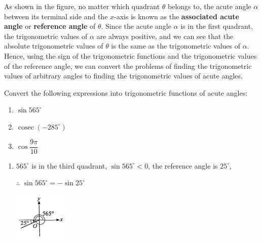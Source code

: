 \documentclass{report}
\begin{document}
As shown in the figure, no matter which quadrant $\theta$ belongs to, the acute angle $\alpha$ between its terminal side and the $x$-axis is known as the \textbf{associated acute angle} or \textbf{reference angle} of $\theta$. Since the acute angle $\alpha$ is in the first quadrant, the trigonometric values of $\alpha$ are always positive, and we can see that the absolute trigonometric values of $\theta$ is the same as the trigonometric values of $\alpha$. Hence, using the sign of the trigonometric functions and the trigonometric values of the reference angle, we can convert the problems of finding the trigonometric values of arbitrary angles to finding the trigonometric values of acute angles.

\begin{question}
    Convert the following expressions into trigonometric functions of acute angles:
    \vspace{-1em}
    \begin{multicols}{3}
        \begin{enumerate}[label=(\alph*)]
            \item $\sin 565^\circ$
            \item $\operatorname{cosec}\left(-285^\circ\right)$
            \item $\cos\dfrac{9\pi}{10}$
        \end{enumerate}
    \end{multicols}

    \sol{}
    \begin{enumerate}[label=(\alph*)]
        \item \begin{multicols}{2}
            $565^\circ$ is in the third quadrant, $\sin 565^\circ < 0$, the reference angle is $25^\circ$,

            $\therefore$ $\sin 565^\circ = -\sin 25^\circ$

            \vfill\null

            \begin{center}
                \includegraphics[width=0.2\textwidth]{assets/9-10.jpg}
            \end{center}
        \end{multicols}


\end{enumerate}
\end{question}
\end{document}
